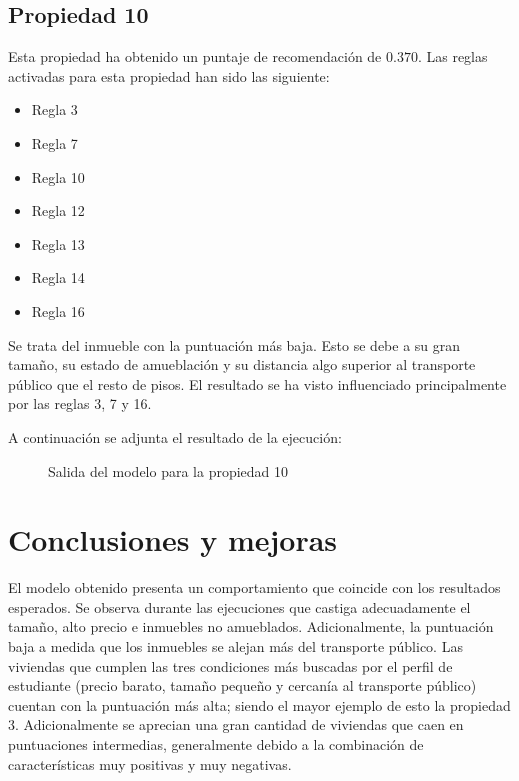 \documentclass[12pt]{report} %
\begin{document}
    \section{Propiedad 10}
    Esta propiedad ha obtenido un puntaje de recomendación de $0.370$. Las
    reglas activadas para esta propiedad han sido las siguiente:
    \begin{itemize}
        \item Regla 3
        \item Regla 7
        \item Regla 10
        \item Regla 12
        \item Regla 13
        \item Regla 14
        \item Regla 16
    \end{itemize}

    Se trata del inmueble con la puntuación más baja. Esto se debe a su gran
    tamaño, su estado de amueblación y su distancia algo superior al transporte
    público que el resto de pisos. El resultado se ha visto influenciado
    principalmente por las reglas 3, 7 y 16.

    A continuación se adjunta el resultado de la ejecución:
    \begin{figure}[H]
        \centering
        \caption{Salida del modelo para la propiedad 10}
    \end{figure}

    \chapter{Conclusiones y mejoras}
    \label{chap:conclusion}

    El modelo obtenido presenta un comportamiento que coincide con los
    resultados esperados. Se observa durante las ejecuciones que castiga
    adecuadamente el tamaño, alto precio e inmuebles no amueblados.
    Adicionalmente, la puntuación baja a medida que los inmuebles se alejan más
    del transporte público. Las viviendas que cumplen las tres condiciones más
    buscadas por el perfil de estudiante (precio barato, tamaño pequeño y
    cercanía al transporte público) cuentan con la puntuación más alta; siendo
    el mayor ejemplo de esto la propiedad 3. Adicionalmente se aprecian una
    gran cantidad de viviendas que caen en puntuaciones intermedias,
    generalmente debido a la combinación de características muy positivas y muy
    negativas.
\end{document}
